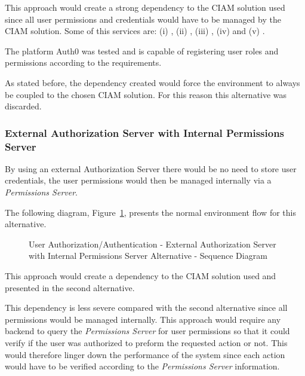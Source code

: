 This approach would create a strong dependency to the \gls{CIAM} solution used since all user permissions and credentials would have to be managed by the \gls{CIAM} solution.
Some of this services are: (i) , (ii) , (iii) , (iv)  and (v) .

The platform Auth0 was tested and is capable of registering user roles and permissions according to the requirements.

As stated before, the dependency created would force the environment to always be coupled to the chosen \gls{CIAM} solution. For this reason this alternative was discarded.

\subsubsection*{External Authorization Server with Internal Permissions Server}
\label{subsubsec:design:alternatives:auth:externalauthinternalpermission}

By using an external Authorization Server there would be no need to store user credentials, the user permissions would then be managed internally via a \textit{Permissions Server}.

The following diagram, Figure~\ref{fig:design:alternatives:auth:externalauthinternalpermission:diagram}, presents the normal environment flow for this alternative.

\begin{figure}[H]
   \centering
   \resizebox{\columnwidth}{!}
   {
      
   }
   \caption[User Authorization/Authentication - External Authorization Server with Internal Permissions Server Alternative - Sequence Diagram]{User Authorization/Authentication - External Authorization Server with Internal Permissions Server Alternative - Sequence Diagram}
   \label{fig:design:alternatives:auth:externalauthinternalpermission:diagram}
\end{figure}

This approach would create a dependency to the \gls{CIAM} solution used and presented in the second alternative.

This dependency is less severe compared with the second alternative since all permissions would be managed internally.
This approach would require any backend to query the \textit{Permissions Server} for user permissions so that it could verify if the user was authorized to preform the requested action or not. This would therefore linger down the performance of the system since each action would have to be verified according to the \textit{Permissions Server} information.

